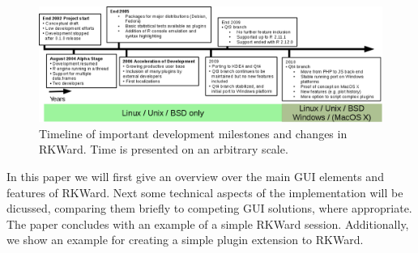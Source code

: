 \begin{figure}[htp]
 \centering
 \includegraphics{../figures/timeline.png}
 \caption{Timeline of important development milestones and changes in RKWard.
          Time is presented on an arbitrary scale.}
 \label{fig:timeline}
\end{figure}

In this paper we will first give an overview over the main GUI elements and
features of RKWard. Next some technical aspects of the implementation will be
dicussed, comparing them briefly to competing GUI solutions, where appropriate.
The paper concludes with an example of a simple RKWard session. Additionally,
we show an example for creating a simple plugin extension to RKWard.
